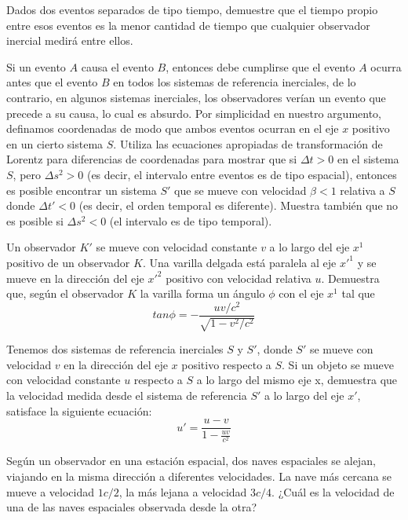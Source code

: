 \documentclass[12pt]{article}
\newenvironment{exercise}[2][Ejercicio]{\begin{trivlist} 
\item[\hskip \labelsep {\bfseries #1}\hskip \labelsep {\bfseries #2.}]}{\end{trivlist}}
\begin{document}
\begin{exercise}{1.10}
Dados dos eventos separados de tipo tiempo, demuestre que el tiempo propio entre esos eventos es la menor cantidad de tiempo que cualquier observador inercial medirá entre ellos.    
\end{exercise}

\begin{exercise}{1.11}
Si un evento $A$ causa el evento $B$, entonces debe cumplirse que el evento $A$ ocurra antes que el evento $B$ en todos los sistemas de referencia inerciales, de lo contrario, en algunos sistemas inerciales, los observadores verían un evento que precede a su causa, lo cual es absurdo. Por simplicidad en nuestro argumento, definamos coordenadas de modo que ambos eventos ocurran en el eje 
$x$ positivo en un cierto sistema $S$. Utiliza las ecuaciones apropiadas de transformación de Lorentz para diferencias de coordenadas para mostrar que si $\Delta t > 0$ en el sistema $S$, pero 
$\Delta s^2>0$ (es decir, el intervalo entre eventos es de tipo espacial), entonces es posible encontrar un sistema $S'$ que se mueve con velocidad $\beta < 1$ relativa a $S$ donde $\Delta t' < 0$
 (es decir, el orden temporal es diferente). Muestra también que no es posible si $\Delta s^2 < 0$ (el intervalo es de tipo temporal).
\end{exercise}

\begin{exercise}{1.12}
Un observador $K'$ se mueve con velocidad constante $v$ a lo largo del eje  $x^1$ positivo de un observador $K$. Una varilla delgada está paralela al eje $x'^1$ y se mueve en la dirección del eje 
$x'^2$ positivo con velocidad relativa $u$. Demuestra que, según el observador $K$ la varilla forma un ángulo $\phi$ con el eje $x^1$ tal que
\[
tan\phi=-\frac{uv/c^2}{\sqrt{1-v^2/c^2}}
\]
\end{exercise}

\begin{exercise}{1.13} 
Tenemos dos sistemas de referencia inerciales $S$ y $S'$, donde $S'$ se mueve con velocidad $v$ en la dirección del eje $x$ positivo respecto a $S$. Si un objeto se mueve con velocidad constante $u$ respecto a $S$ a lo largo del mismo eje x, demuestra que la velocidad medida desde el sistema de referencia $S'$ a lo largo del eje $x'$, satisface la siguiente ecuación:
\[
u' = \frac{u - v}{1 - \frac{u v}{c^2}}
\]
\end{exercise}

\begin{exercise}{1.14}
Según un observador en una estación espacial, dos naves espaciales se alejan, viajando en la misma dirección a diferentes velocidades. La nave más cercana se mueve a velocidad $1c/2$, la más lejana a velocidad $3c/4$. ¿Cuál es la velocidad de una de las naves espaciales observada desde la otra?    
\end{exercise}
\end{document}
